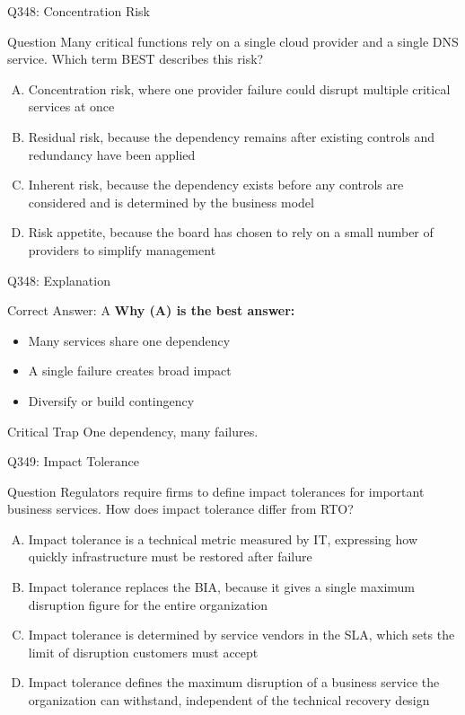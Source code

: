 \documentclass{beamer}
\begin{document}
	\begin{frame}{Q348: Concentration Risk}
		\begin{block}{Question}
			\small Many critical functions rely on a single cloud provider and a single DNS service. Which term BEST describes this risk?
		\end{block}
		\begin{enumerate}[(A)]
			\footnotesize
			\item Concentration risk, where one provider failure could disrupt multiple critical services at once
			\item Residual risk, because the dependency remains after existing controls and redundancy have been applied
			\item Inherent risk, because the dependency exists before any controls are considered and is determined by the business model
			\item Risk appetite, because the board has chosen to rely on a small number of providers to simplify management
		\end{enumerate}
	\end{frame}
	
	\begin{frame}{Q348: Explanation}
		\begin{block}{Correct Answer: A}
			\textbf{Why (A) is the best answer:}
			\begin{itemize}
				\item Many services share one dependency
				\item A single failure creates broad impact
				\item Diversify or build contingency
			\end{itemize}
		\end{block}
		\begin{alertblock}{Critical Trap}
			One dependency, many failures.
		\end{alertblock}
	\end{frame}
	
	\begin{frame}{Q349: Impact Tolerance}
		\begin{block}{Question}
			\small Regulators require firms to define impact tolerances for important business services. How does impact tolerance differ from RTO?
		\end{block}
		\begin{enumerate}[(A)]
			\footnotesize
			\item Impact tolerance is a technical metric measured by IT, expressing how quickly infrastructure must be restored after failure
			\item Impact tolerance replaces the BIA, because it gives a single maximum disruption figure for the entire organization
			\item Impact tolerance is determined by service vendors in the SLA, which sets the limit of disruption customers must accept
			\item Impact tolerance defines the maximum disruption of a business service the organization can withstand, independent of the technical recovery design
		\end{enumerate}
	\end{frame}
	
\end{document}
